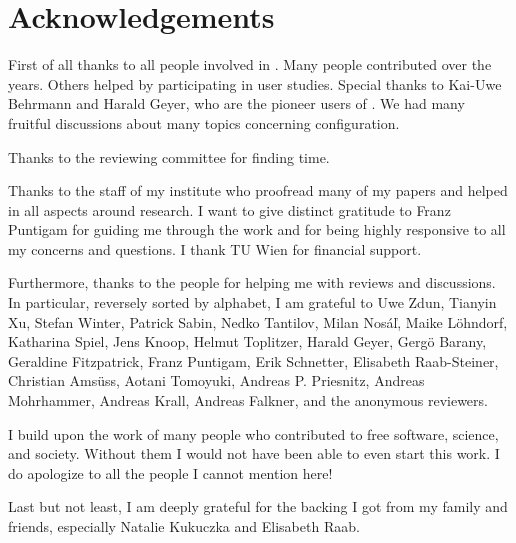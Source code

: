 \chapter{Acknowledgements}


First of all thanks to all people involved in \elektra{}.
Many people contributed over the years.
Others helped by participating in user studies.
Special thanks to Kai-Uwe Behrmann and Harald Geyer, who are the pioneer users of \elektra{}.
We had many fruitful discussions about many topics concerning configuration.

Thanks to the reviewing committee for finding time.

Thanks to the staff of my institute who proofread many of my papers and helped in all aspects around research.
I want to give distinct gratitude to Franz Puntigam for guiding me through the work and for being highly responsive to all my concerns and questions.
I thank TU Wien for financial support.

Furthermore, thanks to the people for helping me with reviews and discussions.
In particular, reversely sorted by alphabet, I am grateful to
Uwe Zdun,
Tianyin Xu,
Stefan Winter,
Patrick Sabin,
Nedko Tantilov,
Milan Nosáľ,
Maike Löhndorf,
Katharina Spiel,
Jens Knoop,
Helmut Toplitzer,
Harald Geyer,
Gergö Barany,
Geraldine Fitzpatrick,
Franz Puntigam,
Erik Schnetter,
Elisabeth Raab-Steiner,
Christian Amsüss,
Aotani Tomoyuki,
Andreas P. Priesnitz,
Andreas Mohrhammer,
Andreas Krall,
Andreas Falkner,
and the anonymous reviewers.

I build upon the work of many people who contributed to free software, science, and society.
Without them I would not have been able to even start this work.
I do apologize to all the people I cannot mention here!

Last but not least, I am deeply grateful for the backing I got from my family and friends, especially Natalie Kukuczka and Elisabeth Raab.
